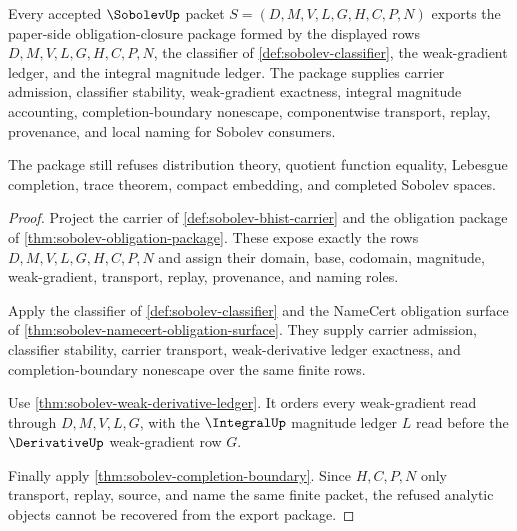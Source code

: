 \begin{theorem}
\label{thm:sobolev-obligation-closure-export}
Every accepted $\SobolevUp$ packet $S=(D,M,V,L,G,H,C,P,N)$ exports the paper-side obligation-closure package formed by the displayed rows $D,M,V,L,G,H,C,P,N$, the classifier of \autoref{def:sobolev-classifier}, the weak-gradient ledger, and the integral magnitude ledger. The package supplies carrier admission, classifier stability, weak-gradient exactness, integral magnitude accounting, completion-boundary nonescape, componentwise transport, replay, provenance, and local naming for Sobolev consumers.

The package still refuses distribution theory, quotient function equality, Lebesgue completion, trace theorem, compact embedding, and completed Sobolev spaces.
\end{theorem}
\begin{proof}
Project the carrier of \autoref{def:sobolev-bhist-carrier} and the obligation package of \autoref{thm:sobolev-obligation-package}. These expose exactly the rows $D,M,V,L,G,H,C,P,N$ and assign their domain, base, codomain, magnitude, weak-gradient, transport, replay, provenance, and naming roles.

Apply the classifier of \autoref{def:sobolev-classifier} and the NameCert obligation surface of \autoref{thm:sobolev-namecert-obligation-surface}. They supply carrier admission, classifier stability, carrier transport, weak-derivative ledger exactness, and completion-boundary nonescape over the same finite rows.

Use \autoref{thm:sobolev-weak-derivative-ledger}. It orders every weak-gradient read through $D,M,V,L,G$, with the $\IntegralUp$ magnitude ledger $L$ read before the $\DerivativeUp$ weak-gradient row $G$.

Finally apply \autoref{thm:sobolev-completion-boundary}. Since $H,C,P,N$ only transport, replay, source, and name the same finite packet, the refused analytic objects cannot be recovered from the export package.
\end{proof}

